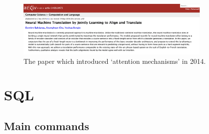 \documentclass[11pt]{article}
\begin{document}
\begin{figure}
\centering 
\includegraphics[width=0.85\textwidth]{paper1.png}
\caption{\label{fig:PAPER1}The paper which introduced `attention mechanisms' in 2014.}
\end{figure}


\section{SQL}

\subsection{Main commands} 
\end{document}
